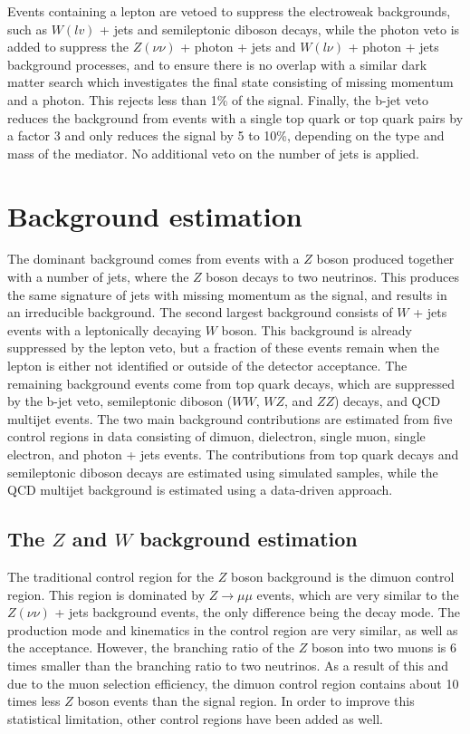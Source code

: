 Events containing a lepton are vetoed to suppress the electroweak backgrounds, such as $W(lv)$ + jets and semileptonic diboson decays, while the photon veto is added to suppress the $Z(\nu\nu)$ + photon + jets and $W(l\nu)$ + photon + jets background processes, and to ensure there is no overlap with a similar dark matter search which investigates the final state consisting of missing momentum and a photon. This rejects less than 1\% of the signal. Finally, the b-jet veto reduces the background from events with a single top quark or top quark pairs by a factor 3 and only reduces the signal by 5 to 10\%, depending on the type and mass of the mediator. No additional veto on the number of jets is applied.

\section{Background estimation}
\label{sec:bkgd}

% 

The dominant background comes from events with a $Z$ boson produced together with a number of jets, where the $Z$ boson decays to two neutrinos. This produces the same signature of jets with missing momentum as the signal, and results in an irreducible background. The second largest background consists of $W$ + jets events with a leptonically decaying $W$ boson. This background is already suppressed by the lepton veto, but a fraction of these events remain when the lepton is either not identified or outside of the detector acceptance. The remaining background events come from top quark decays, which are suppressed by the b-jet veto, semileptonic diboson ($WW$, $WZ$, and $ZZ$) decays, and QCD multijet events. The two main background contributions are estimated from five control regions in data consisting of dimuon, dielectron, single muon, single electron, and photon + jets events.  The contributions from top quark decays and semileptonic diboson decays are estimated using simulated samples, while the QCD multijet background is estimated using a data-driven approach.

\subsection{The \boldmath$Z$ and \boldmath$W$ background estimation}
\label{sec:main_bkgd}

The traditional control region for the $Z$ boson background is the dimuon control region. This region is dominated by $Z\rightarrow\mu\mu$ events, which are very similar to the $Z(\nu\nu)$ + jets background events, the only difference being the decay mode. The production mode and kinematics in the control region are very similar, as well as the acceptance. However, the branching ratio of the $Z$ boson into two muons is 6 times smaller than the branching ratio to two neutrinos. As a result of this and due to the muon selection efficiency, the dimuon control region contains about 10 times less $Z$ boson events than the signal region. In order to improve this statistical limitation, other control regions have been added as well.

